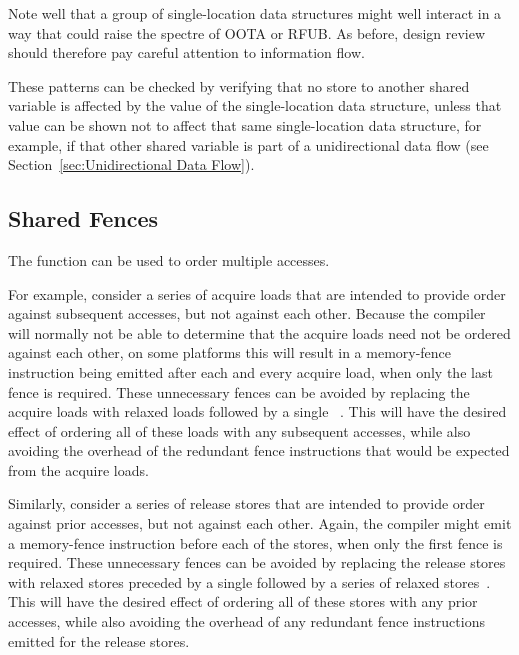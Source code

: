 \documentclass[10]{article}
\begin{document}
Note well that a group of single-location data structures might well
interact in a way that could raise the spectre of OOTA or RFUB.
As before, design review should therefore pay careful attention to
information flow.

These patterns can be checked by verifying that no store to another shared
variable is affected by the value of the single-location data structure,
unless that value can be shown not to affect that same single-location
data structure, for example, if that other shared variable is part of
a unidirectional data flow
(see Section~\ref{sec:Unidirectional Data Flow}).

\subsection{Shared Fences}
\label{sec:Shared Fences}

The  function can be used to order multiple
accesses.

For example, consider a series of acquire loads that are intended to provide
order against subsequent accesses, but not against each other.
Because the compiler will normally not be able to determine that the
acquire loads need not be ordered against each other, on some platforms
this will result in a memory-fence instruction being emitted after each
and every acquire load, when only the last fence is required.
These unnecessary fences can be avoided by replacing the acquire
loads with relaxed loads followed by a single
~\cite[Section 4.1]{RaulSilvera2007WeakMemoryModel}.
This will have the desired effect of ordering all of these loads with any
subsequent accesses, while also avoiding the overhead of the redundant
fence instructions that would be expected from the acquire loads.

Similarly, consider a series of release stores that are intended to provide
order against prior accesses, but not against each other.
Again, the compiler might emit a memory-fence instruction before
each of the stores, when only the first fence is required.
These unnecessary fences can be avoided by replacing the release
stores with relaxed stores preceded by a single
 followed by
a series of relaxed stores~\cite[Section 4.2]{RaulSilvera2007WeakMemoryModel}.
This will have the desired effect of ordering all of these stores with any
prior accesses, while also avoiding the overhead of any redundant
fence instructions emitted for the release stores.
\end{document}
